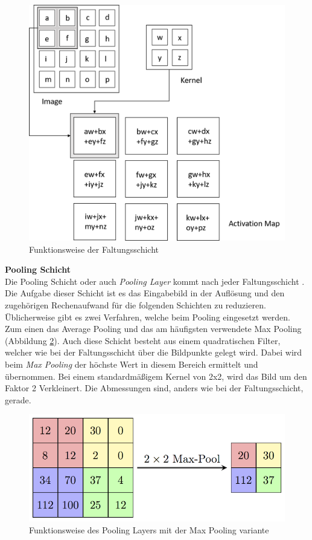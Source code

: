\documentclass[a4paper,12pt,oneside]{article}
\begin{document}
\begin{figure}
	[h]
	\centering
	\includegraphics[scale=0.4]{Sources/CNN.png}
	\caption{Funktionsweise der Faltungsschicht \cite{convolutional2019layer}}
	\label{img:faltungsschicht}
\end{figure}
\newpage
\textbf{Pooling Schicht}\\
Die Pooling Schicht oder auch \textit{Pooling Layer} kommt nach jeder Faltungsschicht \cite[336f.]{goodfellow2016deep}. Die Aufgabe dieser Schicht ist es das Eingabebild in der Auflösung und den zugehörigen Rechenaufwand für die folgenden Schichten zu reduzieren. Üblicherweise gibt es zwei Verfahren, welche beim Pooling eingesetzt werden. Zum einen das Average Pooling und das am häufigsten verwendete Max Pooling (Abbildung \ref{img:maxpooling}). Auch diese Schicht besteht aus einem quadratischen Filter, welcher wie bei der Faltungsschicht über die Bildpunkte gelegt wird. Dabei wird beim \textit{Max Pooling} der höchste Wert in diesem Bereich ermittelt und übernommen. Bei einem standardmäßigem Kernel von 2x2, wird das Bild um den Faktor 2 Verkleinert. Die Abmessungen sind, anders wie bei der Faltungsschicht, gerade. 
\begin{figure}
	[h]
	\centering
	\includegraphics[scale=1.8]{Sources/MaxpoolSample2.png}
	\caption{Funktionsweise des Pooling Layers mit der Max Pooling variante \cite{pooling2018layer}}
	\label{img:maxpooling}
\end{figure}
\end{document}
